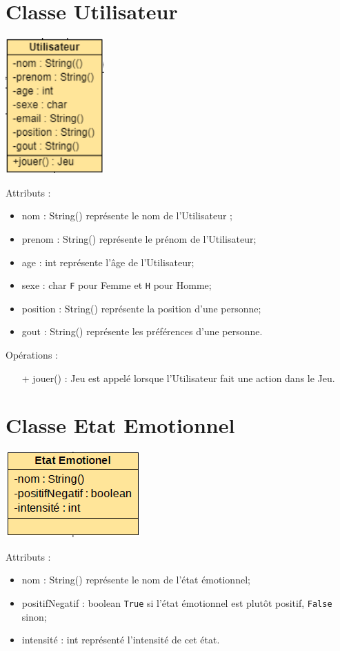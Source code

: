 \documentclass{article}
\begin{document}
	\section{Classe Utilisateur}
		\begin{center}
			\includegraphics[scale=0.5]{include/Classe_Utilisateur.PNG}\newline
		\end{center}
		Attributs :
		\begin{itemize}
			\item nom : String() représente le nom de l’Utilisateur ;
			\item prenom : String() représente le prénom de l’Utilisateur;
			\item age : int représente l’âge de l’Utilisateur;
			\item sexe : char \texttt{F} pour Femme et \texttt{H} pour Homme;
			\item position : String() représente la position d’une personne;
			\item gout : String() représente les préférences d’une personne.
		\end{itemize}
		\medskip
		Opérations :
		\begin{itemize}
			\item[+] jouer() : Jeu est appelé lorsque l'Utilisateur fait une action dans le Jeu.
		\end{itemize}

	\section{Classe Etat Emotionnel}
		\begin{center}
			\includegraphics[scale=0.5]{include/Classe_Etat_Emotionnel.PNG}\newline
		\end{center}
		Attributs :
		\begin{itemize}
			\item nom : String() représente le nom de l’état émotionnel;
			\item positifNegatif : boolean \texttt{True} si l’état émotionnel est plutôt positif, \texttt{False} sinon;
			\item intensité : int représenté l’intensité de cet état.
		\end{itemize}
\end{document}
